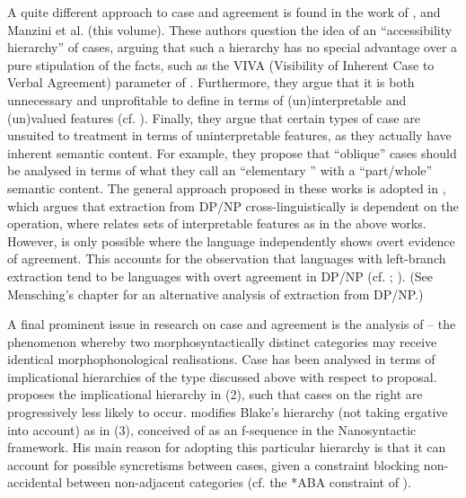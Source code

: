 \documentclass[output=paper]{langsci/langscibook}
\begin{document}
A quite different approach to case and agreement is found in the work of \citet{Manzini2016}, \citet{Franco2017} and Manzini et al. (this volume). These authors question the idea of an ``accessibility hierarchy'' of cases, arguing that such a hierarchy has no special advantage over a pure stipulation of the facts, such as the VIVA (Visibility of Inherent Case to Verbal Agreement) parameter of \citet{Anand2006}. Furthermore, they argue that it is both unnecessary and unprofitable to define  in terms of (un)interpretable and (un)valued features (cf. \citealt{Brody1997}). Finally, they argue that certain types of case are unsuited to treatment in terms of uninterpretable features, as they actually have inherent semantic content. For example, they propose that ``oblique'' cases should be analysed in terms of what they call an ``elementary '' with a ``part\slash whole'' semantic content. The general approach proposed in these works is adopted in \citet{Reeve2018}, which argues that extraction from DP\slash NP cross-linguistically is dependent on the  operation, where  relates sets of interpretable features as in the above works. However,  is only possible where the language independently shows overt evidence of agreement. This accounts for the observation that languages with left-branch extraction tend to be languages with overt agreement in DP\slash NP (cf. \citealt[237--238]{Ross1967}; \citealt[188]{Horn1983}). (See Mensching’s chapter for an alternative analysis of extraction from DP\slash NP.)

A final prominent issue in research on case and agreement is the analysis of  – the phenomenon whereby two morphosyntactically distinct categories may receive identical morphophonological realisations. Case  has been analysed in terms of implicational hierarchies of the type discussed above with respect to  proposal. \citet{Blake2001} proposes the implicational hierarchy in (2), such that cases on the right are progressively less likely to occur. \citet{Caha2009} modifies Blake’s hierarchy (not taking ergative into account) as in (3), conceived of as an f-sequence in the Nanosyntactic framework. His main reason for adopting this particular hierarchy is that it can account for possible syncretisms between cases, given a constraint blocking non-accidental  between non-adjacent categories (cf. the *ABA constraint of \citealt{Bobaljik2012}).
\end{document}
